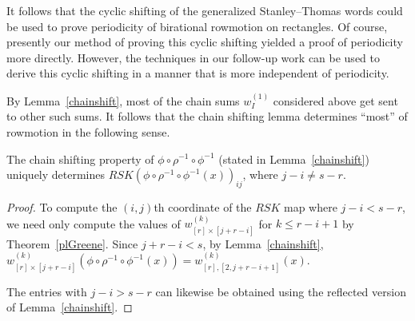\documentclass[ALCO,Unicode,published]{cedram}
\numberwithin{equation}{section}
\begin{document}
It follows that the cyclic shifting of the generalized Stanley--Thomas words could be used to prove periodicity of birational rowmotion on rectangles. Of course, presently our method of proving this cyclic shifting yielded a proof of periodicity more directly. However, the techniques in our follow-up work \cite{johnsonliu3} can be used to derive this cyclic shifting in a manner that is more independent of periodicity.

By Lemma~\ref{chainshift}, most of the chain sums $w_I^{(1)}$ considered above get sent to other such sums. It follows that the chain shifting lemma determines ``most'' of rowmotion in the following sense.



\begin{Cor}
The chain shifting property of $\phi \circ \rho^{-1} \circ \phi^{-1}$ (stated in Lemma~\ref{chainshift})
uniquely determines $RSK(\phi \circ \rho^{-1} \circ \phi^{-1}(x))_{ij}$, where $j-i \neq s-r$.
\end{Cor}

\begin{proof}
To compute the $(i,j)$th coordinate of the $RSK$ map where $j-i<s-r$, we need only compute the values of $w_{[r] \times [j+r-i]}^{(k)}$ for $k \leq r-i+1$ by Theorem~\ref{plGreene}. Since $j+r-i<s$, by Lemma~\ref{chainshift}, $w_{[r] \times [j+r-i]}^{(k)}(\phi \circ \rho^{-1} \circ \phi^{-1}(x)) = w_{[r],[2,j+r-i+1]}^{(k)}(x)$.

The entries with $j-i>s-r$ can likewise be obtained using the reflected version of Lemma~\ref{chainshift}.
\end{proof}









 






\end{document}
